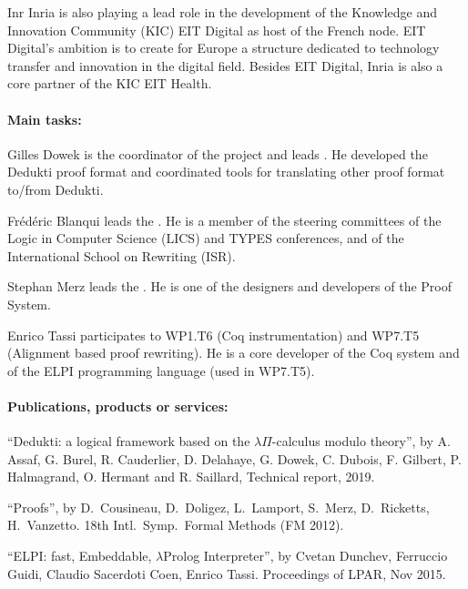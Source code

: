 \begin{sitedescription}{Inr}
Inria is also playing a lead role in the development of the Knowledge and Innovation Community (KIC) EIT Digital as host of the French node. EIT Digital’s ambition is to create for Europe a structure dedicated to technology transfer and innovation in the digital field. Besides EIT Digital, Inria is also a core partner of the KIC EIT Health.

\paragraph*{Main tasks:}


\begin{compactitem}
\item Gilles Dowek is the coordinator of the project and leads
  . He developed the Dedukti proof format and
  coordinated tools for translating other proof format to/from
  Dedukti.
\item Frédéric Blanqui leads the . He is a member of the
  steering committees of the Logic in Computer Science (LICS) and
  TYPES conferences, and of the International School on Rewriting
  (ISR).
\item Stephan Merz leads the . He is one of the designers
  and developers of the \tlaplus Proof System.
\item Enrico Tassi participates to WP1.T6 (Coq
instrumentation) and WP7.T5 (Alignment based proof rewriting). He is a core
developer of the Coq system and of the ELPI programming language (used in WP7.T5).
\end{compactitem}

\paragraph*{Publications, products or services:}


\begin{compactitem}
\item ``Dedukti: a logical framework based on the $\lambda\Pi$-calculus modulo theory'', by A. Assaf, G. Burel, R. Cauderlier, D. Delahaye, G. Dowek, C. Dubois, F. Gilbert, P. Halmagrand, O. Hermant and R. Saillard, Technical report, 2019.
\item ``\tlaplus Proofs'', by D.\ Cousineau, D.\ Doligez, L.\ Lamport, S.\ Merz, D.\  Ricketts, H.\ Vanzetto. 18th Intl.\ Symp.\ Formal Methods (FM 2012).
\item ``ELPI: fast, Embeddable, $\lambda$Prolog Interpreter'', by Cvetan Dunchev, Ferruccio Guidi, Claudio Sacerdoti Coen, Enrico Tassi. Proceedings of LPAR, Nov 2015.
\end{compactitem}


\end{sitedescription}
